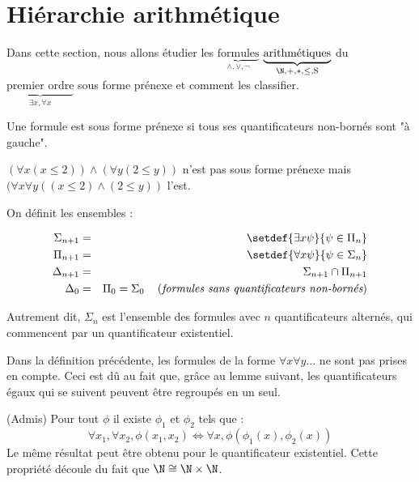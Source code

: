 \section{Hiérarchie arithmétique}


Dans cette section, nous allons étudier les $\underbrace{\text{formules}}_{\land, \lor, \lnot}$
$\underbrace{\text{arithmétiques}}_{\N, +, *, \leq, \text{S}}$ du $\underbrace{\text{premier ordre}}_{\exists x, \forall x}$
sous forme prénexe et comment les classifier.


\begin{definition}
	Une formule est sous forme prénexe si tous ses quantificateurs non-bornés sont "à gauche".

	$(\forall x (x \leq 2)) \land  (\forall y (2 \leq y))$ n'est pas sous forme prénexe mais $(\forall x \forall y ((x \leq 2) \land  (2 \leq y))$ l'est.
\end{definition}

\begin{definition}
	On définit les ensembles :

	\begin{eqnarray*}
		\Sigma_{n + 1} &=& \setdef { \exists x \psi } {\psi \in \Pi_n}  \\
		\Pi_{n + 1} &=& \setdef { \forall x \psi } {\psi \in \Sigma_n}  \\
		\Delta_{n + 1} &=& \Sigma_{n + 1} \cap \Pi_{n + 1} \\
		\Delta_0 &=& \Pi_0 = \Sigma_0 \reason {formules sans quantificateurs non-bornés}
	\end{eqnarray*}

	Autrement dit, $\Sigma_n$ est l'ensemble des formules avec $n$ quantificateurs alternés, qui commencent par un quantificateur existentiel.
\end{definition}

\begin{remarque}
	Dans la définition précédente, les formules de la forme $\forall x \forall y \ldots$ ne sont pas prises en compte. Ceci est dû au fait que, grâce
	au lemme suivant, les quantificateurs égaux qui se suivent peuvent être regroupés en un seul.
\end{remarque}

\begin{lemma}(Admis)
	Pour tout $\phi$ il existe $\phi_1$ et $\phi_2$ tels que :
	$$ \forall x_1, \forall x_2, \phi (x_1,x_2) \iff \forall x, \phi(\phi_1(x), \phi_2(x))$$
	Le même résultat peut être obtenu pour le quantificateur existentiel.
	Cette propriété découle du fait que $\N \cong \N \times \N$.
\end{lemma}

